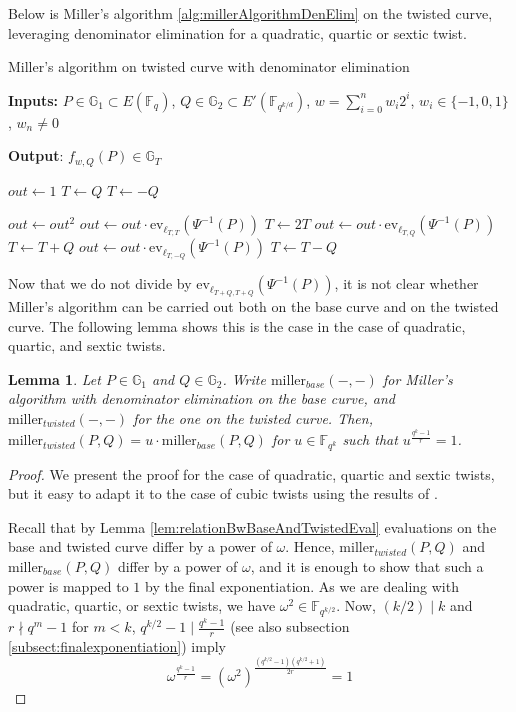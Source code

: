 \documentclass{article}
\newcommand{\gOne}{\mathbb{G}_1}
\newcommand{\gTwo}{\mathbb{G}_2}
\newcommand{\gT}{\mathbb{G}_T}
\newcommand{\ev}{\mathrm{ev}}
\newcommand{\fq}[1]{\mathbb{F}_{q^{#1}}}
\theoremstyle{remark}
\theoremstyle{plain}
\newtheorem{lemma}{Lemma}[section]
\begin{document}
Below is Miller's algorithm \eqref{alg:millerAlgorithmDenElim} on the twisted curve, leveraging denominator elimination for a quadratic, quartic or sextic twist.
\begin{algorithm}
    \caption{\small Miller's algorithm on twisted curve with denominator elimination}\label{alg:millerAlgorithmDenElim}
    \textbf{Inputs:} $P \in \gOne \subset E(\fq{})$, $Q \in \gTwo \subset E'(\fq{k/d})$, $w = \sum_{i=0}^n w_i 2^i$, $w_i \in \{-1,0,1\}$, $w_n \neq 0$

    \textbf{Output}: $f_{w,Q}(P) \in \gT$
    \begin{algorithmic}
        \State $out \gets 1$
            \State $T \gets Q$
        \Else
            \State $T \gets -Q$
        \EndIf

        \State $out \gets out^2$
        \State $out \gets out \cdot \ev_{\ell_{T,T}}(\Psi^{-1}(P))$
        \State $T \gets 2T$
            \State $out \gets out \cdot \ev_{\ell_{T,Q}}(\Psi^{-1}(P))$
            \State $T \gets T + Q$
        \Else
            \State $out \gets out \cdot \ev_{\ell_{T,-Q}}(\Psi^{-1}(P))$
            \State $T \gets T - Q$
        \EndIf
        \EndFor
    \end{algorithmic}
\end{algorithm}

Now that we do not divide by $\ev_{\ell_{T+Q,T+Q}}(\Psi^{-1}(P))$, it is not clear whether Miller's algorithm can be carried out both on the base curve and on the twisted curve.
The following lemma shows this is the case in the case of quadratic, quartic, and sextic twists.

\begin{lemma}
    Let $P \in \gOne$ and $Q \in \gTwo$.
    Write $\mathrm{miller}_{base}(-,-)$ for Miller's algorithm with denominator elimination on the base curve, and $\mathrm{miller}_{twisted}(-,-)$ for the one on the twisted curve.
    Then, $\mathrm{miller}_{twisted}(P,Q) = u \cdot \mathrm{miller}_{base}(P,Q)$ for $u \in \fq{k}$ such that $u^{\frac{q^k-1}{r}} = 1$.
\end{lemma}

\begin{proof}
    We present the proof for the case of quadratic, quartic and sextic twists, but it easy to adapt it to the case of cubic twists using the results of \cite{LZZW-cubic-den-elim}.

    Recall that by Lemma \ref{lem:relationBwBaseAndTwistedEval} evaluations on the base and twisted curve differ by a power of $\omega$.
    Hence, $\mathrm{miller}_{twisted}(P,Q)$ and $\mathrm{miller}_{base}(P,Q)$ differ by a power of $\omega$, and it is enough to show that such a power is mapped to $1$ by the final exponentiation.
    As we are dealing with quadratic, quartic, or sextic twists, we have $\omega^2 \in \fq{k/2}$.
    Now, $(k/2) \mid k$ and $r \nmid q^m - 1$ for $m < k$, $q^{k/2} - 1 \mid \frac{q^k - 1}{r}$ (see also subsection \ref{subsect:finalexponentiation}) imply
    \[
        \omega^{\frac{q^k-1}{r}} = \left( \omega^2 \right)^{\frac{(q^{k/2}-1)(q^{k/2}+1)}{2r}} = 1
    \]
\end{proof}
\end{document}
